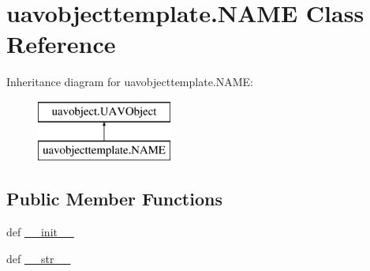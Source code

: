 \hypertarget{classuavobjecttemplate_1_1_n_a_m_e}{\section{uavobjecttemplate.\-N\-A\-M\-E \-Class \-Reference}
\label{classuavobjecttemplate_1_1_n_a_m_e}
}
\-Inheritance diagram for uavobjecttemplate.\-N\-A\-M\-E\-:\begin{figure}[H]
\begin{center}
\leavevmode
\includegraphics[height=2.000000cm]{classuavobjecttemplate_1_1_n_a_m_e}
\end{center}
\end{figure}
\subsection*{\-Public \-Member \-Functions}
\begin{DoxyCompactItemize}
\item 
def \hyperlink{classuavobjecttemplate_1_1_n_a_m_e_aa97857632b4376be8b6d917e66f1aa33}{\-\_\-\-\_\-init\-\_\-\-\_\-}
\item 
def \hyperlink{classuavobjecttemplate_1_1_n_a_m_e_a591135272acdb1690e9435e299294ffa}{\-\_\-\-\_\-str\-\_\-\-\_\-}
\end{DoxyCompactItemize}
